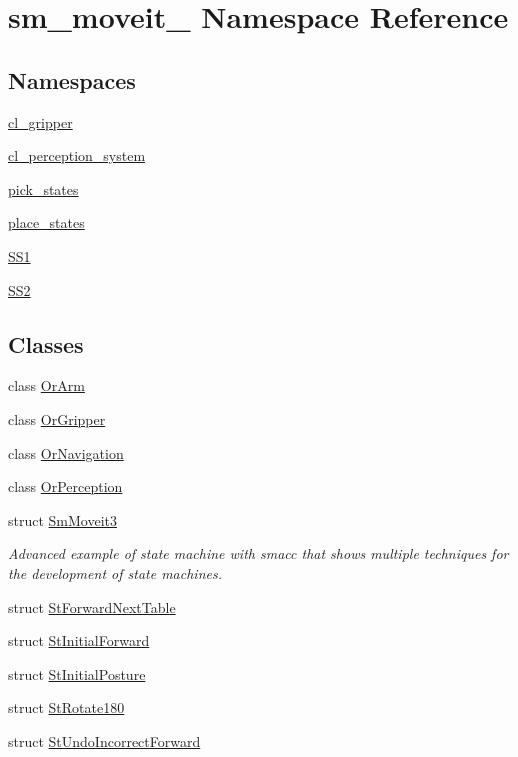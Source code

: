 \hypertarget{namespacesm__moveit__3}{}\section{sm\+\_\+moveit\+\_ Namespace Reference}
\label{namespacesm__moveit__3}
\subsection*{Namespaces}
\begin{DoxyCompactItemize}
\item 
 \hyperlink{namespacesm__moveit__3_1_1cl__gripper}{cl\+\_\+gripper}
\item 
 \hyperlink{namespacesm__moveit__3_1_1cl__perception__system}{cl\+\_\+perception\+\_\+system}
\item 
 \hyperlink{namespacesm__moveit__3_1_1pick__states}{pick\+\_\+states}
\item 
 \hyperlink{namespacesm__moveit__3_1_1place__states}{place\+\_\+states}
\item 
 \hyperlink{namespacesm__moveit__3_1_1SS1}{S\+S1}
\item 
 \hyperlink{namespacesm__moveit__3_1_1SS2}{S\+S2}
\end{DoxyCompactItemize}
\subsection*{Classes}
\begin{DoxyCompactItemize}
\item 
class \hyperlink{classsm__moveit__3_1_1OrArm}{Or\+Arm}
\item 
class \hyperlink{classsm__moveit__3_1_1OrGripper}{Or\+Gripper}
\item 
class \hyperlink{classsm__moveit__3_1_1OrNavigation}{Or\+Navigation}
\item 
class \hyperlink{classsm__moveit__3_1_1OrPerception}{Or\+Perception}
\item 
struct \hyperlink{structsm__moveit__3_1_1SmMoveit3}{Sm\+Moveit3}
\begin{DoxyCompactList}\small\item\em Advanced example of state machine with smacc that shows multiple techniques for the development of state machines. \end{DoxyCompactList}\item 
struct \hyperlink{structsm__moveit__3_1_1StForwardNextTable}{St\+Forward\+Next\+Table}
\item 
struct \hyperlink{structsm__moveit__3_1_1StInitialForward}{St\+Initial\+Forward}
\item 
struct \hyperlink{structsm__moveit__3_1_1StInitialPosture}{St\+Initial\+Posture}
\item 
struct \hyperlink{structsm__moveit__3_1_1StRotate180}{St\+Rotate180}
\item 
struct \hyperlink{structsm__moveit__3_1_1StUndoIncorrectForward}{St\+Undo\+Incorrect\+Forward}
\end{DoxyCompactItemize}
